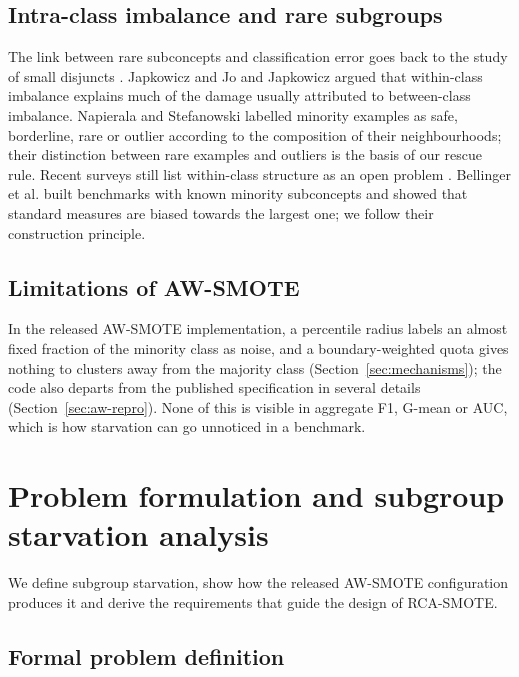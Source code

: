 \documentclass[preprint,nopreprintline]{elsarticle}
\theoremstyle{plain}
\theoremstyle{definition}
\begin{document}
\subsection{Intra-class imbalance and rare subgroups}\label{sec:rw-intra}

The link between rare subconcepts and classification error goes back to the study of small disjuncts \cite{holte1989concept}. Japkowicz \cite{japkowicz2001concept} and Jo and Japkowicz \cite{jo2004class} argued that within-class imbalance explains much of the damage usually attributed to between-class imbalance. Napierala and Stefanowski \cite{napierala2016types} labelled minority examples as safe, borderline, rare or outlier according to the composition of their neighbourhoods; their distinction between rare examples and outliers is the basis of our rescue rule. Recent surveys still list within-class structure as an open problem \cite{krawczyk2016learning}. Bellinger et al. \cite{bellinger2024performance} built benchmarks with known minority subconcepts and showed that standard measures are biased towards the largest one; we follow their construction principle.

\subsection{Limitations of AW-SMOTE}\label{sec:rw-aw}

In the released AW-SMOTE implementation, a percentile radius labels an almost fixed fraction of the minority class as noise, and a boundary-weighted quota gives nothing to clusters away from the majority class (Section~\ref{sec:mechanisms}); the code also departs from the published specification in several details (Section~\ref{sec:aw-repro}). None of this is visible in aggregate F1, G-mean or AUC, which is how starvation can go unnoticed in a benchmark.

\section{Problem formulation and subgroup starvation analysis}\label{sec:problem}

We define subgroup starvation, show how the released AW-SMOTE configuration produces it and derive the requirements that guide the design of RCA-SMOTE.

\subsection{Formal problem definition}\label{sec:formal}
\end{document}
